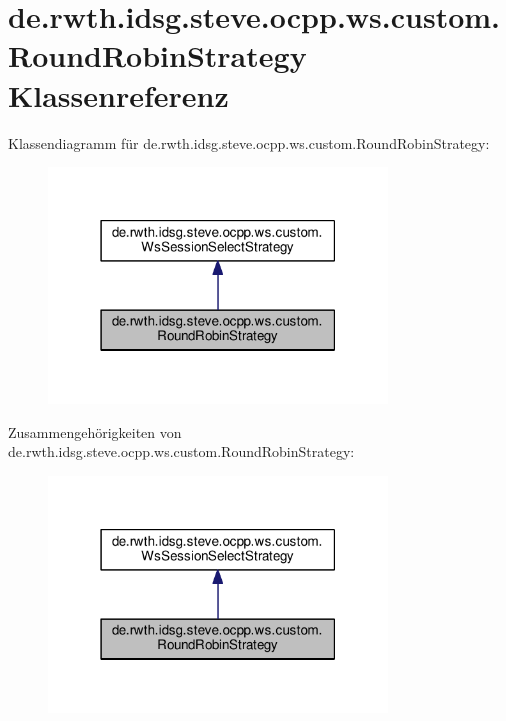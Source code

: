 \hypertarget{classde_1_1rwth_1_1idsg_1_1steve_1_1ocpp_1_1ws_1_1custom_1_1_round_robin_strategy}{\section{de.\+rwth.\+idsg.\+steve.\+ocpp.\+ws.\+custom.\+Round\+Robin\+Strategy Klassenreferenz}
\label{classde_1_1rwth_1_1idsg_1_1steve_1_1ocpp_1_1ws_1_1custom_1_1_round_robin_strategy}
}


Klassendiagramm für de.\+rwth.\+idsg.\+steve.\+ocpp.\+ws.\+custom.\+Round\+Robin\+Strategy\+:\nopagebreak
\begin{figure}[H]
\begin{center}
\leavevmode
\includegraphics[width=255pt]{classde_1_1rwth_1_1idsg_1_1steve_1_1ocpp_1_1ws_1_1custom_1_1_round_robin_strategy__inherit__graph}
\end{center}
\end{figure}


Zusammengehörigkeiten von de.\+rwth.\+idsg.\+steve.\+ocpp.\+ws.\+custom.\+Round\+Robin\+Strategy\+:\nopagebreak
\begin{figure}[H]
\begin{center}
\leavevmode
\includegraphics[width=255pt]{classde_1_1rwth_1_1idsg_1_1steve_1_1ocpp_1_1ws_1_1custom_1_1_round_robin_strategy__coll__graph}
\end{center}
\end{figure}
